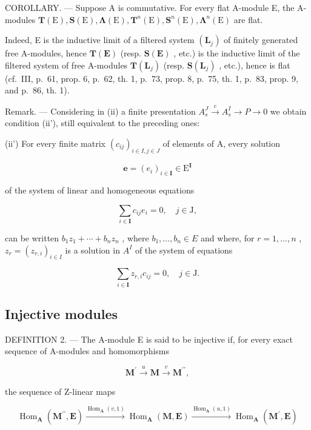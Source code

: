 COROLLARY. — Suppose A is commutative. For every flat A-module E, the A-modules \(\mathbf{T}(\mathrm{E}),\mathbf{S}(\mathrm{E}),\symbf{\Lambda}(\mathrm{E}),\mathbf{T}^{n}(\mathrm{E}),\mathbf{S}^{n}(\mathrm{E}),\symbf{\Lambda}^{n}(\mathrm{E})\) are flat.

Indeed, E is the inductive limit of a filtered system \((\mathbf{L}_{j})\) of finitely generated free A-modules, hence \(\mathbf{T}(\mathbf{E})\) (resp. \(\mathbf{S}(\mathbf{E})\) , etc.) is the inductive limit of the filtered system of free A-modules \(\mathbf{T}(\mathbf{L}_{j})\) (resp. \(\mathbf{S}(\mathbf{L}_{j})\) , etc.), hence is flat (cf.~III, p.~61, prop. 6, p.~62, th. 1, p.~73, prop. 8, p.~75, th. 1, p.~83, prop. 9, and p.~86, th. 1).

Remark. --- Considering in (ii) a finite presentation \(A_{s}^{J} \xrightarrow{c} A_{s}^{I} \to P \to 0\) we obtain condition (ii'), still equivalent to the preceding ones:

(ii') For every finite matrix \((c_{ij})_{i\in I,j\in J}\) of elements of A, every solution

\[
\pmb {e} = (e _ {i}) _ {i \in \mathbf {I}} \in \mathrm{E} ^ {\mathbf {I}}
\]

of the system of linear and homogeneous equations

\[
\sum_ {i \in \mathbf {I}} c _ {i j} e _ {i} = 0, \quad j \in \mathrm{J},
\]

can be written \(b_{1}z_{1}+\cdots+b_{n}z_{n}\) , where \(b_{1},\ldots,b_{n}\in E\) and where, for \(r=1,\ldots,n\) , \(z_{r}=(z_{r,i})_{i\in I}\) is a solution in \(A^{I}\) of the system of equations

\[
\sum_ {i \in \mathbf {I}} z _ {r, i} c _ {i j} = 0, \quad j \in \mathrm{J}.
\]

\subsection{Injective modules}

DEFINITION 2. --- The A-module E is said to be injective if, for every exact sequence of A-modules and homomorphisms

\[
\mathbf {M} ^ {\prime} \xrightarrow {u} \mathbf {M} \xrightarrow {v} \mathbf {M} ^ {\prime \prime},\tag{19}
\]

the sequence of Z-linear maps

\[
\operatorname{Hom} _ {\mathbf {A}} \left(\mathbf {M} ^ {\prime \prime}, \mathbf {E}\right) \xrightarrow {\operatorname{Hom} _ {\mathbf {A}} (v , 1)} \operatorname{Hom} _ {\mathbf {A}} (\mathbf {M}, \mathbf {E}) \xrightarrow {\operatorname{Hom} _ {\mathbf {A}} (u , 1)} \operatorname{Hom} _ {\mathbf {A}} \left(\mathbf {M} ^ {\prime}, \mathbf {E}\right)\tag{20}
\]

